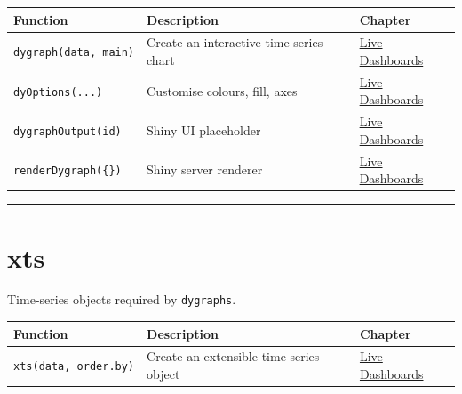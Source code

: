 \documentclass[
  11pt,
  letterpaper,
  DIV=11,
  numbers=noendperiod]{scrreprt}
\begin{document}
\begin{longtable}[]{@{}
  >{\raggedright\arraybackslash}p{}
  >{\raggedright\arraybackslash}p{}
  >{\raggedright\arraybackslash}p{}@{}}
\toprule\noalign{}
\begin{minipage}[b]{\linewidth}\raggedright
Function
\end{minipage} & \begin{minipage}[b]{\linewidth}\raggedright
Description
\end{minipage} & \begin{minipage}[b]{\linewidth}\raggedright
Chapter
\end{minipage} \\
\midrule\noalign{}
\endhead
\bottomrule\noalign{}
\endlastfoot
\texttt{dygraph(data,\ main)} & Create an interactive time-series chart
& \hyperref[live-dashboards]{Live Dashboards} \\
\texttt{dyOptions(...)} & Customise colours, fill, axes &
\hyperref[live-dashboards]{Live Dashboards} \\
\texttt{dygraphOutput(id)} & Shiny UI placeholder &
\hyperref[live-dashboards]{Live Dashboards} \\
\texttt{renderDygraph(\{\})} & Shiny server renderer &
\hyperref[live-dashboards]{Live Dashboards} \\
\end{longtable}

\begin{center}\rule{0.5\linewidth}{0.5pt}\end{center}

\section{xts}\label{xts}

Time-series objects required by \texttt{dygraphs}.

\begin{longtable}[]{@{}
  >{\raggedright\arraybackslash}p{}
  >{\raggedright\arraybackslash}p{}
  >{\raggedright\arraybackslash}p{}@{}}
\toprule\noalign{}
\begin{minipage}[b]{\linewidth}\raggedright
Function
\end{minipage} & \begin{minipage}[b]{\linewidth}\raggedright
Description
\end{minipage} & \begin{minipage}[b]{\linewidth}\raggedright
Chapter
\end{minipage} \\
\midrule\noalign{}
\endhead
\bottomrule\noalign{}
\endlastfoot
\texttt{xts(data,\ order.by)} & Create an extensible time-series object
& \hyperref[live-dashboards]{Live Dashboards} \\
\end{longtable}
\end{document}
